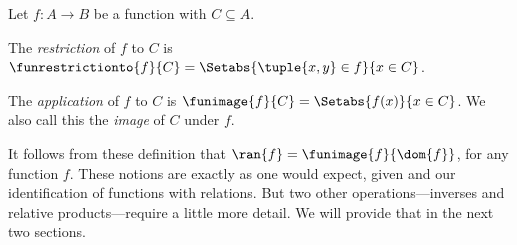 \documentclass[../../../include/open-logic-section]{subfiles}
\begin{document}
\begin{defn}
	 Let $f \colon A \to B$ be a function with $C\subseteq A$.
	 
	 The \emph{restriction} of $f$ to $C$ is $\funrestrictionto{f}{C} = \Setabs{\tuple{x, y} \in f}{x \in C}$.

	The \emph{application} of $f$ to $C$ is $\funimage{f}{C} = \Setabs{f(x)}{x \in C}$. We also call this the \emph{image} of $C$ under $f$.
\end{defn}
\begin{explain}
	It follows from these definition that $\ran{f} = \funimage{f}{\dom{f}}$, for any function $f$. These notions are exactly as one would expect, given  and our identification of functions with relations. But two other operations---inverses and relative products---require a little more detail. We will provide that in the next two sections.
\end{explain}
\end{document}
